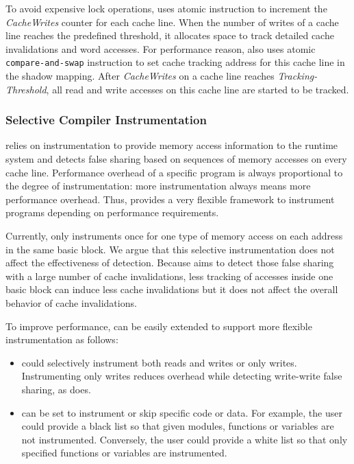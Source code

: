To avoid expensive lock operations, \Predator{} uses atomic instruction to increment 
the {\it CacheWrites} counter for each cache line. 
When the number of writes of a cache line reaches the predefined threshold,
it allocates space to track detailed cache invalidations and word accesses.
For performance reason, \Predator{} also 
uses atomic \texttt{compare-and-swap} instruction to set cache tracking address for this cache line in
the shadow mapping.
After {\it CacheWrites} on a cache line reaches {\it Tracking-Threshold}, 
all read and write accesses on this cache line are started to be tracked.


\subsubsection{Selective Compiler Instrumentation}
\Predator{} relies on instrumentation to provide memory access information to the runtime system 
and detects false sharing based on sequences of memory accesses on every cache line. 
Performance overhead of a specific program is always proportional to 
the degree of instrumentation: more 
instrumentation always means more performance overhead. 
Thus, \Predator{} provides a very flexible framework to instrument programs 
depending on performance requirements. 

Currently, \Predator{} only instruments once for one type of memory access on each address 
in the same basic block. 
We argue that this selective instrumentation does not affect the effectiveness of detection. 
Because \Predator{} aims to detect those false sharing with a large number of cache invalidations,
less tracking of accesses inside one basic block can induce less cache invalidations 
but it does not affect the overall behavior of cache invalidations. 

To improve performance,
\Predator{} can be easily extended to support more flexible instrumentation as follows:
\begin{itemize}
\item
\Predator{} could selectively instrument both reads and writes or only writes.
Instrumenting only writes reduces overhead while detecting write-write false sharing, 
as \Sheriff{} does. 
\item
\Predator{} can be set to instrument or skip specific code or data. 
For example, the user could provide a black list so that given modules,
functions or variables are not instrumented. 
Conversely, the user could provide a white list so that only specified functions or variables are instrumented. 
\end{itemize}

